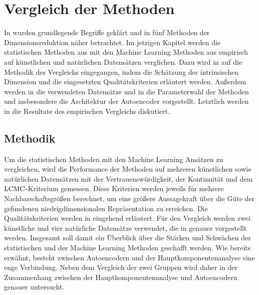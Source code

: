 \chapter{Vergleich der Methoden}
\label{ch:Vergleich}

In  wurden grundlegende Begriffe geklärt und in
 fünf Methoden der Dimensionsreduktion näher betrachtet. Im jetzigen
Kapitel werden die statistischen Methoden aus  mit den
Machine Learning Methoden aus  empirisch auf künstlichen und
natürlichen Datensätzen verglichen. Dazu wird in  auf die
Methodik des Vergleichs eingegangen, indem die Schätzung der intrinsischen Dimension und die
eingesetzten Qualitätskriterien erläutert werden. Außerdem werden in
 die verwendeten Datensätze und in
 die Parameterwahl der Methoden und
insbesondere die Architektur der Autoencoder vorgestellt. Letztlich werden in
 die Resultate des empirischen Vergleichs diskutiert.

\section{Methodik}
\label{ch:Vergleich:sec:Methodik}

Um die statistischen Methoden mit den Machine Learning Ansätzen zu vergleichen, wird die
Performance der Methoden auf mehreren künstlichen sowie natürlichen Datensätzen mit der
Vertrauenswürdigkeit, der Kontinuität und dem $\operatorname{LCMC}$-Kriterium gemessen. Diese Kriterien werden
jeweils für mehrere Nachbarschaftsgrößen berechnet, um eine größere Aussagekraft über die Güte der
gefundenen niedrigdimensionalen Repräsentation zu erreichen. Die Qualitätskriterien werden in
 eingehend erläutert. Für den
Vergleich werden zwei künstliche und vier natürliche Datensätze verwendet, die in
 genauer vorgestellt werden. Insgesamt soll damit
ein Überblick über die Stärken und Schwächen der statistischen und der Machine Learning Methoden
geschafft werden. Wie bereits erwähnt, besteht zwischen Autoencodern und der
Hauptkomponentenanalyse eine enge Verbindung. Neben dem Vergleich der zwei Gruppen wird daher in
 der Zusammenhang zwischen der Hauptkomponentenanalyse
und Autoencodern genauer untersucht.


